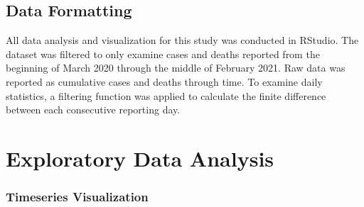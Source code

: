 \documentclass[11pt,]{article}
\begin{document}
\hypertarget{data-formatting}{%
\subsection{Data Formatting}\label{data-formatting}}

All data analysis and visualization for this study was conducted in
RStudio. The dataset was filtered to only examine cases and deaths
reported from the beginning of March 2020 through the middle of February
2021. Raw data was reported as cumulative cases and deaths through time.
To examine daily statistics, a filtering function was applied to
calculate the finite difference between each consecutive reporting day.

\hypertarget{exploratory-data-analysis}{%
\section{Exploratory Data Analysis}\label{exploratory-data-analysis}}

\hypertarget{timeseries-visualization}{%
\subsubsection{Timeseries
Visualization}\label{timeseries-visualization}}
\end{document}

